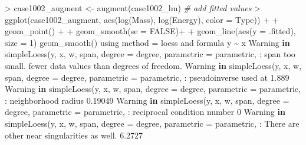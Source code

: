 \documentclass[
]{article}
\newenvironment{Shaded}{\begin{snugshade}}{\end{snugshade}}
\newcommand{\AttributeTok}[1]{\textcolor[rgb]{0.77,0.63,0.00}{#1}}
\newcommand{\CommentTok}[1]{\textcolor[rgb]{0.56,0.35,0.01}{\textit{#1}}}
\newcommand{\ConstantTok}[1]{\textcolor[rgb]{0.00,0.00,0.00}{#1}}
\newcommand{\ControlFlowTok}[1]{\textcolor[rgb]{0.13,0.29,0.53}{\textbf{#1}}}
\newcommand{\DecValTok}[1]{\textcolor[rgb]{0.00,0.00,0.81}{#1}}
\newcommand{\FloatTok}[1]{\textcolor[rgb]{0.00,0.00,0.81}{#1}}
\newcommand{\FunctionTok}[1]{\textcolor[rgb]{0.00,0.00,0.00}{#1}}
\newcommand{\NormalTok}[1]{#1}
\newcommand{\OtherTok}[1]{\textcolor[rgb]{0.56,0.35,0.01}{#1}}
\newcommand{\SpecialCharTok}[1]{\textcolor[rgb]{0.00,0.00,0.00}{#1}}
\newcommand{\StringTok}[1]{\textcolor[rgb]{0.31,0.60,0.02}{#1}}
\begin{document}
\begin{Shaded}
\begin{Highlighting}[]
\SpecialCharTok{\textgreater{}}\NormalTok{ case1002\_augment }\OtherTok{\textless{}{-}} \FunctionTok{augment}\NormalTok{(case1002\_lm)  }\CommentTok{\# add fitted values}
\SpecialCharTok{\textgreater{}} \FunctionTok{ggplot}\NormalTok{(case1002\_augment, }\FunctionTok{aes}\NormalTok{(}\StringTok{\textasciigrave{}}\AttributeTok{log(Mass)}\StringTok{\textasciigrave{}}\NormalTok{, }\StringTok{\textasciigrave{}}\AttributeTok{log(Energy)}\StringTok{\textasciigrave{}}\NormalTok{, }\AttributeTok{color =}\NormalTok{ Type)) }\SpecialCharTok{+} 
\SpecialCharTok{+}   \FunctionTok{geom\_point}\NormalTok{() }\SpecialCharTok{+} 
\SpecialCharTok{+}   \FunctionTok{geom\_smooth}\NormalTok{(}\AttributeTok{se =} \ConstantTok{FALSE}\NormalTok{)}\SpecialCharTok{+} 
\SpecialCharTok{+}   \FunctionTok{geom\_line}\NormalTok{(}\FunctionTok{aes}\NormalTok{(}\AttributeTok{y =}\NormalTok{ .fitted), }\AttributeTok{size =} \DecValTok{1}\NormalTok{)}
\StringTok{\textasciigrave{}}\AttributeTok{geom\_smooth()}\StringTok{\textasciigrave{}}\NormalTok{ using method }\OtherTok{=} \StringTok{\textquotesingle{}loess\textquotesingle{}}\NormalTok{ and formula }\StringTok{\textquotesingle{}y \textasciitilde{} x\textquotesingle{}}
\NormalTok{Warning }\ControlFlowTok{in} \FunctionTok{simpleLoess}\NormalTok{(y, x, w, span, }\AttributeTok{degree =}\NormalTok{ degree, }\AttributeTok{parametric =}
\NormalTok{parametric, }\SpecialCharTok{:}\NormalTok{ span too small. fewer data values than degrees of freedom.}
\NormalTok{Warning }\ControlFlowTok{in} \FunctionTok{simpleLoess}\NormalTok{(y, x, w, span, }\AttributeTok{degree =}\NormalTok{ degree, }\AttributeTok{parametric =}
\NormalTok{parametric, }\SpecialCharTok{:}\NormalTok{ pseudoinverse used at }\FloatTok{1.889}
\NormalTok{Warning }\ControlFlowTok{in} \FunctionTok{simpleLoess}\NormalTok{(y, x, w, span, }\AttributeTok{degree =}\NormalTok{ degree, }\AttributeTok{parametric =}
\NormalTok{parametric, }\SpecialCharTok{:}\NormalTok{ neighborhood radius }\FloatTok{0.19049}
\NormalTok{Warning }\ControlFlowTok{in} \FunctionTok{simpleLoess}\NormalTok{(y, x, w, span, }\AttributeTok{degree =}\NormalTok{ degree, }\AttributeTok{parametric =}
\NormalTok{parametric, }\SpecialCharTok{:}\NormalTok{ reciprocal condition number }\DecValTok{0}
\NormalTok{Warning }\ControlFlowTok{in} \FunctionTok{simpleLoess}\NormalTok{(y, x, w, span, }\AttributeTok{degree =}\NormalTok{ degree, }\AttributeTok{parametric =}
\NormalTok{parametric, }\SpecialCharTok{:}\NormalTok{ There are other near singularities as well. }\FloatTok{6.2727}

\end{Highlighting}
\end{Shaded}
\end{document}

